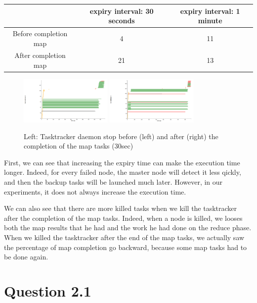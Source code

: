 \documentclass{article}
\begin{document}
\begin{center}
\begin{tabular}{|c|c|c|}
\hline
\ & expiry interval: 30 seconds & expiry interval: 1 minute \\
\hline
Before completion map & 4 & 11 \\
\hline
After completion map & 21 & 13 \\
\hline
\end{tabular}
\end{center}


\begin{figure}%
  \centering
  \includegraphics[width=0.4\textwidth]{expiry30before.png}
  \includegraphics[width=0.4\textwidth]{expiry30after.png}
  \caption{Left: Tasktracker daemon stop before (left) and after (right) the completion of the map tasks (30sec)}
  \label{kill}
\end{figure}


First, we can see that increasing the expiry time can make the execution time longer. Indeed, for every failed node, the master node will detect it less qickly, and then the backup tasks will be launched much later. However, in our experiments, it does not always increase the execution time.

We can also see that there are more killed tasks when we kill the tasktracker after the completion of the map tasks. Indeed, when a node is killed, we looses both the map results that he had and the work he had done on the reduce phase. When we killed the tasktracker after the end of the map tasks, we actually saw the percentage of map completion go backward, because some map tasks had to be done again.

\section*{Question 2.1}
\end{document}
